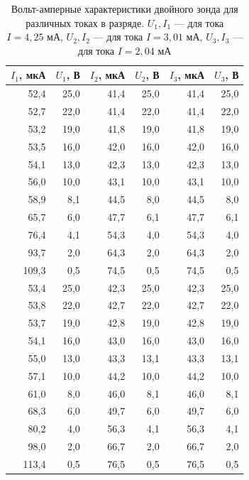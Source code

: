 \documentclass[12pt]{article}
\begin{document}
\begin{table}
	\centering
	\begin{tabular}{|r|r|r|r|r|r|}
		\hline
		$I_1$, мкА & $U_1$, В & $I_2$, мкА & $U_2$, В & $I_3$, мкА & $U_3$, В \\ \hline
		52,4       & 25,0     & 41,4       & 25,0     & 41,4       & 25,0     \\ \hline
		52,7       & 22,0     & 41,4       & 22,0     & 41,4       & 22,0     \\ \hline
		53,2       & 19,0     & 41,8       & 19,0     & 41,8       & 19,0     \\ \hline
		53,5       & 16,0     & 42,0       & 16,0     & 42,0       & 16,0     \\ \hline
		54,1       & 13,0     & 42,3       & 13,0     & 42,3       & 13,0     \\ \hline
		56,0       & 10,0     & 43,1       & 10,0     & 43,1       & 10,0     \\ \hline
		58,9       & 8,1      & 44,5       & 8,0      & 44,5       & 8,0      \\ \hline
		65,7       & 6,0      & 47,7       & 6,1      & 47,7       & 6,1      \\ \hline
		76,4       & 4,1      & 54,3       & 4,0      & 54,3       & 4,0      \\ \hline
		93,7       & 2,0      & 64,3       & 2,0      & 64,3       & 2,0      \\ \hline
		109,3      & 0,5      & 74,5       & 0,5      & 74,5       & 0,5      \\ \hline
		53,4       & 25,0     & 42,3       & 25,0     & 42,3       & 25,0     \\ \hline
		53,8       & 22,0     & 42,7       & 22,0     & 42,7       & 22,0     \\ \hline
		53,7       & 19,0     & 42,8       & 19,0     & 42,8       & 19,0     \\ \hline
		54,1       & 16,0     & 43,0       & 16,0     & 43,0       & 16,0     \\ \hline
		55,0       & 13,0     & 43,3       & 13,1     & 43,3       & 13,1     \\ \hline
		57,1       & 10,0     & 44,2       & 10,0     & 44,2       & 10,0     \\ \hline
		61,0       & 8,0      & 46,0       & 8,1      & 46,0       & 8,1      \\ \hline
		68,3       & 6,0      & 49,7       & 6,0      & 49,7       & 6,0      \\ \hline
		80,2       & 4,0      & 56,3       & 4,1      & 56,3       & 4,1      \\ \hline
		98,0       & 2,0      & 66,7       & 2,0      & 66,7       & 2,0      \\ \hline
		113,4      & 0,5      & 76,5       & 0,5      & 76,5       & 0,5      \\ \hline
	\end{tabular}
	\caption{Вольт-амперные характеристики двойного зонда для различных токах
		в разряде. $U_1, I_1$ --- для тока $I = 4,25$ мА, $U_2, I_2$ --- для тока $I = 3,01$ мА,
		$U_3, I_3$ --- для тока $I = 2,04$ мА  }
	\label{tab:2}
\end{table}
\end{document}
